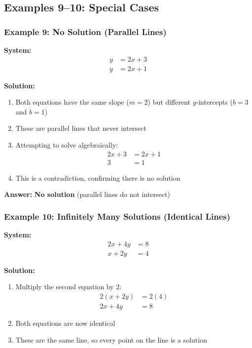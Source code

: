 \documentclass{article}
\begin{document}
\subsection{Examples 9--10: Special Cases}

\subsubsection{Example 9: No Solution (Parallel Lines)}

\textbf{System:}
\begin{align*}
y &= 2x + 3 \\
y &= 2x + 1
\end{align*}

\textbf{Solution:}

\begin{enumerate}
    \item Both equations have the same slope ($m = 2$) but different $y$-intercepts ($b = 3$ and $b = 1$)
    \item These are parallel lines that never intersect
    \item Attempting to solve algebraically:
    \begin{align*}
        2x + 3 &= 2x + 1 \\
        3 &= 1
    \end{align*}
    \item This is a contradiction, confirming there is no solution
\end{enumerate}

\textbf{Answer:} \textbf{No solution} (parallel lines do not intersect) \,  

\subsubsection{Example 10: Infinitely Many Solutions (Identical Lines)}

\textbf{System:}
\begin{align*}
2x + 4y &= 8 \\
x + 2y &= 4
\end{align*}

\textbf{Solution:}

\begin{enumerate}
    \item Multiply the second equation by 2:
    \begin{align*}
        2(x + 2y) &= 2(4) \\
        2x + 4y &= 8
    \end{align*}
    \item Both equations are now identical
    \item These are the same line, so every point on the line is a solution
\end{enumerate}
\end{document}

